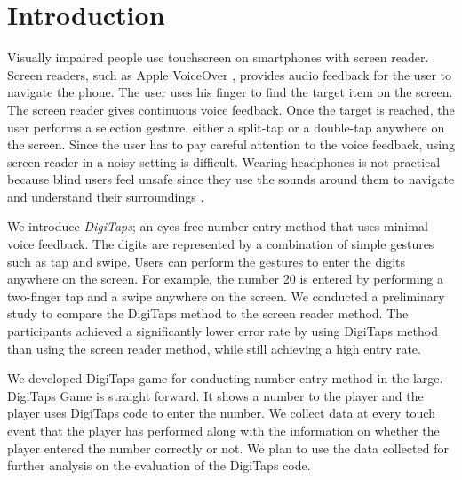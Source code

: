 \section{Introduction}
\label{sec:intro}

Visually impaired people use touchscreen on smartphones with screen reader. Screen readers, such as Apple VoiceOver \cite{VoiceOver:2014}, provides audio feedback for the user to navigate the phone. The user uses his finger to find the target item on the screen. The screen reader gives continuous voice feedback. Once the target is reached, the user performs a selection gesture, either a split-tap or a double-tap anywhere on the screen. Since the user has to pay careful attention to the voice feedback, using screen reader in a noisy setting is difficult. Wearing headphones is not practical because blind users feel unsafe since they use the sounds around them to navigate and understand their surroundings \cite{Azenkot:2011}.
\par
We introduce \textit{DigiTaps}; an eyes-free number entry method that uses minimal voice feedback. The digits are represented by a combination of simple gestures such as tap and swipe. Users can perform the gestures to enter the digits anywhere on the screen. For example, the number 20 is entered by performing a two-finger tap and a swipe anywhere on the screen. We conducted a preliminary study to compare the DigiTaps method to the screen reader method. The participants achieved a significantly lower error rate by using DigiTaps method than using the screen reader method, while still achieving a high entry rate.
\par
We developed DigiTaps game for conducting number entry method in the large. DigiTaps Game is straight forward. It shows a number to the player and the player uses DigiTaps code to enter the number. We collect data at every touch event that the player has performed along with the information on whether the player entered the number correctly or not. We plan to use the data collected for further analysis on the evaluation of the DigiTaps code.

\begin{comment}
Outline:
  - Background on why we come up with DigiTaps code: Continuous feedback hard to use in a noisy setting.
  - evidence of other method presented
  - why DigiTaps game? DigiTaps game is for what?

\end{comment}
